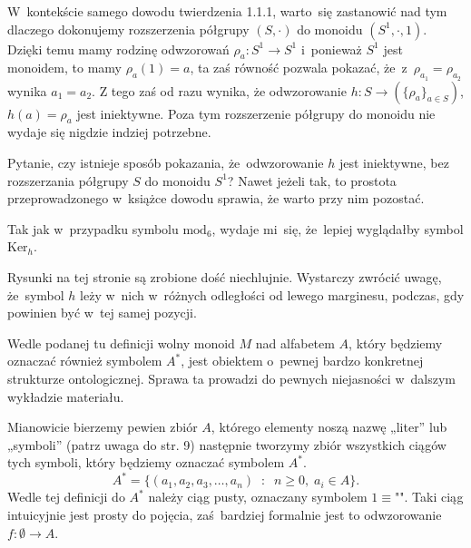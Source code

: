 \documentclass[a4paper,11pt]{article}
\begin{document}
W~kontekście samego dowodu twierdzenia 1.1.1, warto~się zastanowić nad
tym dlaczego dokonujemy rozszerzenia półgrupy $( S, \cdot )$ do
monoidu $( S^{ 1 }, \cdot, 1 )$. Dzięki temu mamy rodzinę odwzorowań
$\rho_{ a } : S^{ 1 } \to S^{ 1 }$ i~ponieważ $S^{ 1 }$ jest monoidem,
to mamy $\rho_{ a }( 1 ) = a$, ta zaś równość pozwala pokazać,
że~z~$\rho_{ a_{ 1 } } = \rho_{ a_{ 2 } }$ wynika $a_{ 1 } = a_{ 2 }$.
Z tego zaś od razu wynika, że odwzorowanie
$h : S \to ( \{ \rho_{ a } \}_{ a \in S } )$, $h( a ) = \rho_{ a }$
jest iniektywne. Poza tym rozszerzenie półgrupy do monoidu nie wydaje
się nigdzie indziej potrzebne.

Pytanie, czy istnieje sposób pokazania, że~odwzorowanie $h$ jest
iniektywne, bez rozszerzania półgrupy $S$ do monoidu $S^{ 1 }$? Nawet
jeżeli tak, to prostota przeprowadzonego w~książce dowodu sprawia, że
warto przy nim pozostać.

\vspace{\spaceFour}





\start {} Tak jak w~przypadku symbolu $\textrm{mod}_{ 6 }$,
wydaje mi~się, że~lepiej wyglądałby symbol $\textrm{Ker}_{ h }$.

\vspace{\spaceFour}





\start {} Rysunki na tej stronie są zrobione dość niechlujnie.
Wystarczy zwrócić uwagę, że~symbol $h$ leży w~nich w~różnych odległości od
lewego marginesu, podczas, gdy powinien być w~tej samej pozycji.

\vspace{\spaceFour}





\start {} Wedle podanej tu definicji wolny monoid $M$ nad
alfabetem $A$, który będziemy oznaczać również symbolem $A^{ * }$,
jest obiektem o~pewnej bardzo konkretnej strukturze ontologicznej.
Sprawa ta prowadzi do pewnych niejasności w~dalszym wykładzie
materiału.

Mianowicie bierzemy pewien zbiór $A$, którego elementy noszą nazwę
„liter” lub „symboli” (patrz uwaga do str. 9) następnie tworzymy zbiór
wszystkich ciągów tych symboli, który będziemy oznaczać symbolem
$A^{ * }$.
\begin{equation}
  \label{eq:Forys-Forys-02}
  A^{ * } =
  \{ ( a_{ 1 }, a_{ 2 }, a_{ 3 }, \ldots, a_{ n } ) \;\; : \;\; n \geq 0, \;
  a_{ i } \in A \}.
\end{equation}
Wedle tej definicji do $A^{ * }$ należy ciąg pusty, oznaczany symbolem
$1 \equiv \texttt{""}$. Taki ciąg intuicyjnie jest prosty do pojęcia,
zaś~bardziej formalnie jest to odwzorowanie $f : \emptyset \to A$.
\end{document}
